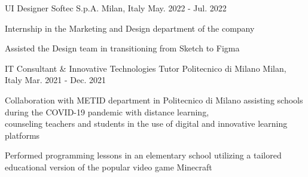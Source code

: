 \begin{cventries}
  \cventry
    {UI Designer} %
    {Softec S.p.A.} %
    {Milan, Italy} %
    {May. 2022 - Jul. 2022} %
    {
      \begin{cvitems} %
        {Internship in the Marketing and Design department of the company}
        \item {}
        \item {Assisted the Design team in transitioning from Sketch to Figma}
      \end{cvitems}
    }

  \cventry
    {IT Consultant \& Innovative Technologies Tutor} %
    {Politecnico di Milano} %
    {Milan, Italy} %
    {Mar. 2021 - Dec. 2021} %
    {
      \begin{cvitems} %
        {Collaboration with METID department in Politecnico di Milano assisting schools during the COVID-19 pandemic with distance learning, \\counseling teachers and students in the use of digital and innovative learning platforms}
        \item {}
        \item {Performed programming lessons in an elementary school utilizing a tailored educational version of the popular video game Minecraft}
      \end{cvitems}
    }

\end{cventries}
